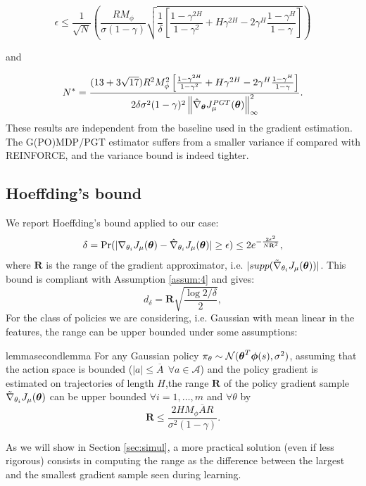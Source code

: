 \[
\epsilon \leq \frac{1}{\sqrt{N}}\left(\frac{RM_{\phi}}
				{\sigma(1-\gamma)}\sqrt{\frac{1}{\delta}
				\left[\frac{1-\gamma^{2H}}{1-\gamma^2} + H\gamma^{2H} - 2\gamma^H
				\frac{1-\gamma^H}{1-\gamma}\right]}\right)
\]

and

\[
N^* = \frac{(13+3\sqrt{17})R^2M_{\phi}^2
			\left[\frac{1-\gamma^{2H}}{1-\gamma^2} + H\gamma^{2H} - 2\gamma^H
	 		\frac{1-\gamma^H}{1-\gamma}\right]}
	 		{2\delta\sigma^2(1-\gamma)^2
	 			\norm[\infty]{\gradPGT{\vtheta}}^2}.
\]
These results are independent from the baseline used in the gradient estimation. The G(PO)MDP/PGT estimator suffers from a smaller variance if compared with REINFORCE, and the variance bound is indeed tighter.

\subsection{Hoeffding's bound}
We report Hoeffding's bound applied to our case:
\[
	\delta = \Pr(|\gradJ{\theta_i} - \gradApp{\theta_i}| \geq \epsilon)
		 \leq 2e^{-\frac{2\epsilon^2}{N\mathbf{R}^2}},
\]
where $\mathbf{R}$ is the range of the gradient approximator, i.e. $|supp(\gradSim{\theta_i})|$.
This bound is compliant with Assumption \ref{assum:4} and gives:
\[
d_\delta = \mathbf{R}\sqrt{\frac{\log{2/\delta}}{2}},
\]
For the class of policies we are considering, i.e. Gaussian with mean linear in the features, the range can be upper bounded under some assumptions:

\begin{restatable}{lemma}{secondlemma}
For any Gaussian policy $\pi_\theta \sim \mathcal{N}(\vtheta^T\vphi(s),\sigma^2)$, assuming that the action space is bounded ($|a|\leq \overline{A}\:\:\forall a \in \mathcal{A}$) and the policy gradient is estimated on trajectories of length $H$,the range $\mathbf{R}$ of the policy gradient sample $\gradSim{\theta_i}$ can be upper bounded $\forall i=1,\dots,m$ and $\forall \theta$ by
\[
\mathbf{R} \leq \frac{2HM_{\phi}\overline{A}R}{\sigma^2(1-\gamma)}.
\]
\end{restatable}

As we will show in Section \ref{sec:simul}, a more practical solution (even if less rigorous) consists in computing the range as the difference between the largest and the smallest gradient sample seen during learning.

